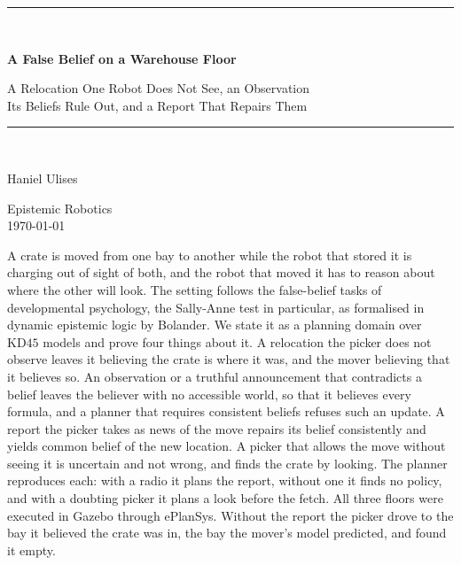 \documentclass[11pt,a4paper]{article}
\theoremstyle{definition}
\begin{document}
\begin{titlepage}
\centering
\vspace*{2.4cm}
{\color{rulegrey}\rule{\textwidth}{0.8pt}}\\[0.9cm]
{\LARGE\bfseries A False Belief on a Warehouse Floor\par}
\vspace{0.5cm}
{\large\color{slate} A Relocation One Robot Does Not See, an Observation\\
Its Beliefs Rule Out, and a Report That Repairs Them\par}
\vspace{0.7cm}
{\color{rulegrey}\rule{\textwidth}{0.8pt}}\\[1.4cm]

{\large Haniel Ulises\par}
\vspace{0.3cm}
{\color{slate} Epistemic Robotics}\\
\vspace{0.15cm}
{\color{slate}\today}

\vfill
{\color{slate}\small
A crate is moved from one bay to another while the robot that stored it is
charging out of sight of both, and the robot that moved it has to reason about
where the other will look. The setting follows the false-belief tasks of
developmental psychology, the Sally-Anne test in particular, as formalised in
dynamic epistemic logic by Bolander. We state it as a planning domain over
$\mathrm{KD45}$ models and prove four things about it. A relocation the picker
does not observe leaves it believing the crate is where it was, and the mover
believing that it believes so. An observation or a truthful announcement that
contradicts a belief leaves the believer with no accessible world, so that it
believes every formula, and a planner that requires consistent beliefs refuses
such an update. A report the picker takes as news of the move repairs its belief
consistently and yields common belief of the new location. A picker that allows
the move without seeing it is uncertain and not wrong, and finds the crate by
looking. The planner reproduces each: with a radio it plans the report, without
one it finds no policy, and with a doubting picker it plans a look before the
fetch. All three floors were executed in Gazebo through ePlanSys. Without the
report the picker drove to the bay it believed the crate was in, the bay the
mover's model predicted, and found it empty.}
\vspace{1.2cm}
\end{titlepage}
\end{document}
